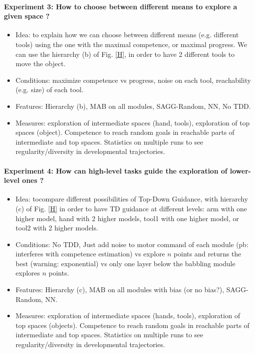 \documentclass[12pt]{article}
\begin{document}
				\paragraph{Experiment 3: How to choose between different means to explore a given space ?}
				\begin{itemize}
					\item Idea: to explain how we can choose between different means (e.g. different tools) using the one with the maximal competence, or maximal progress.
							We can use the hierarchy (b) of Fig. \ref{H}, in order to have 2 different tools to move the object.
					
					\item Conditions: maximize competence vs progress, noise on each tool, reachability (e.g. size) of each tool.
					
					\item Features: Hierarchy (b), MAB on all modules, SAGG-Random, NN, No TDD.
					
					\item Measures: exploration of intermediate spaces (hand, tools), exploration of top spaces (object). Competence to reach random goals in reachable parts of intermediate and top spaces. 
							Statistics on multiple runs to see regularity/diversity in developmental trajectories.
				\end{itemize}
				
				\paragraph{Experiment 4: How can high-level tasks guide the exploration of lower-level ones ?}
				\begin{itemize}
					\item Idea: tocompare different possibilities of Top-Down Guidance, with hierarchy (c) of Fig. \ref{H} in order to have TD guidance at different levels: 
							arm with one higher model, hand with 2 higher models, tool1 with one higher model, or tool2 with 2 higher models.
					
					\item Conditions: No TDD, Just add noise to motor command of each module (pb: interferes with competence estimation) 
							vs explore $n$ points and returns the best (warning: exponential)
							vs only one layer below the babbling module explores $n$ points.
					
					\item Features: Hierarchy (c), MAB on all modules with bias (or no bias?), SAGG-Random, NN.
					
					\item Measures: exploration of intermediate spaces (hands, tools), exploration of top spaces (objects). Competence to reach random goals in reachable parts of intermediate and top spaces. 
							Statistics on multiple runs to see regularity/diversity in developmental trajectories.
				\end{itemize}
				
\end{document}
